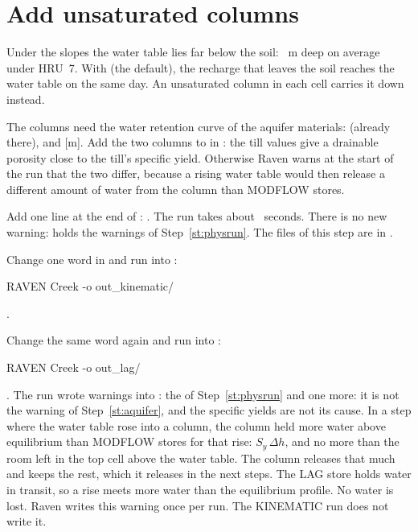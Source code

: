 \section{Add unsaturated columns}\label{sec:vz}
Under the slopes the water table lies far below the soil: ~m deep on average under HRU~7. With
 (the default), the recharge that leaves the soil reaches the water table on the same day. An
unsaturated column in each cell carries it down instead.

\label{st:aquifer}
The columns need the water retention curve of the aquifer materials:  (already there),  and
 [m]. Add the two columns to  in :
\why the till values give a drainable porosity close to the till's specific yield. Otherwise Raven warns at the start of
the run that the two differ, because a rising water table would then release a different amount of water from the
column than MODFLOW stores.

\label{st:richards}
Add one line at the end of :
\see {}. The run takes about ~seconds. There is no new
warning:  holds the  warnings of Step~\ref{st:physrun}. The files of
this step are in .

Change one word in  and run into :
\begin{shell}
$ $RAVEN Creek -o out_kinematic/
\end{shell}
\see {}.

\label{st:lag}
Change the same word again and run into :
\begin{shell}
$ $RAVEN Creek -o out_lag/
\end{shell}
\see {}. The run wrote  warnings into
: the  of Step~\ref{st:physrun} and one more:
\why it is not the warning of Step~\ref{st:aquifer}, and the specific yields are not its cause. In a step where the
water table rose into a column, the column held more water above equilibrium than MODFLOW stores for that rise:
$S_y\,\Delta h$, and no more than the room left in the top cell above the water table. The column releases that much and
keeps the rest, which it releases in the next steps. The LAG store holds water in transit, so a rise meets more water
than the equilibrium profile. No water is lost. Raven writes this warning once per run. The KINEMATIC run does not
write it.

